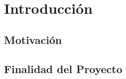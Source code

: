 \chapter{Introducción} %

\label{Chapter1} %


\clearpage
\section{Motivación}


\clearpage
\section{Finalidad del Proyecto}
